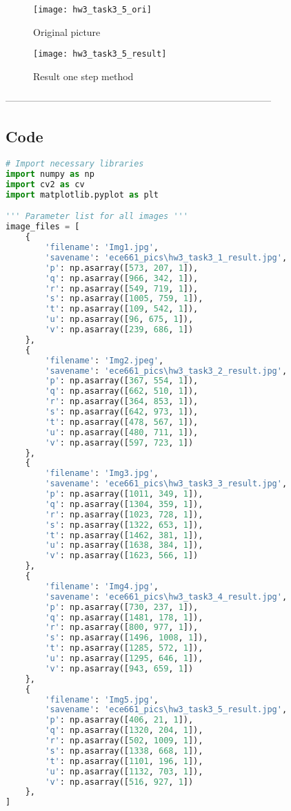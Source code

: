 \documentclass[11pt]{article}
\begin{document}
\begin{figure}[H]
\centering
\texttt{[image: hw3\_task3\_5\_ori]}
\caption{Original picture}
\label{}
\end{figure}

\begin{figure}[H]
\centering
\texttt{[image: hw3\_task3\_5\_result]}
\caption{Result one step method}
\label{}
\end{figure}


-----------------------------------------------------------------------------------

\subsection*{Code}

\begin{lstlisting}[language=Python, showstringspaces=false]
# Import necessary libraries
import numpy as np
import cv2 as cv
import matplotlib.pyplot as plt  

''' Parameter list for all images '''
image_files = [
    {
        'filename': 'Img1.jpg',
        'savename': 'ece661_pics\hw3_task3_1_result.jpg',
        'p': np.asarray([573, 207, 1]),
        'q': np.asarray([966, 342, 1]),
        'r': np.asarray([549, 719, 1]),
        's': np.asarray([1005, 759, 1]),
        't': np.asarray([109, 542, 1]),
        'u': np.asarray([96, 675, 1]),
        'v': np.asarray([239, 686, 1])
    },
    {
        'filename': 'Img2.jpeg',
        'savename': 'ece661_pics\hw3_task3_2_result.jpg',
        'p': np.asarray([367, 554, 1]),
        'q': np.asarray([662, 510, 1]),
        'r': np.asarray([364, 853, 1]),
        's': np.asarray([642, 973, 1]),
        't': np.asarray([478, 567, 1]),
        'u': np.asarray([480, 711, 1]),
        'v': np.asarray([597, 723, 1])
    },
    {
        'filename': 'Img3.jpg',
        'savename': 'ece661_pics\hw3_task3_3_result.jpg',
        'p': np.asarray([1011, 349, 1]),
        'q': np.asarray([1304, 359, 1]),
        'r': np.asarray([1023, 728, 1]),
        's': np.asarray([1322, 653, 1]),
        't': np.asarray([1462, 381, 1]),
        'u': np.asarray([1638, 384, 1]),
        'v': np.asarray([1623, 566, 1])
    },
    {
        'filename': 'Img4.jpg',
        'savename': 'ece661_pics\hw3_task3_4_result.jpg',
        'p': np.asarray([730, 237, 1]),
        'q': np.asarray([1481, 178, 1]),
        'r': np.asarray([800, 977, 1]),
        's': np.asarray([1496, 1008, 1]),
        't': np.asarray([1285, 572, 1]),
        'u': np.asarray([1295, 646, 1]),
        'v': np.asarray([943, 659, 1])
    },
    {
        'filename': 'Img5.jpg',
        'savename': 'ece661_pics\hw3_task3_5_result.jpg',
        'p': np.asarray([406, 21, 1]),
        'q': np.asarray([1320, 204, 1]),
        'r': np.asarray([502, 1009, 1]),
        's': np.asarray([1338, 668, 1]),
        't': np.asarray([1101, 196, 1]),
        'u': np.asarray([1132, 703, 1]),
        'v': np.asarray([516, 927, 1])
    },
]


\end{lstlisting}
\end{document}

